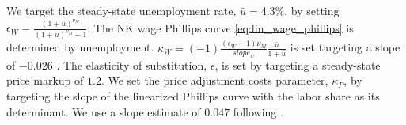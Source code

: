 \documentclass[12pt,3p,authoryear,review]{elsarticle}
\begin{document}
We target the steady-state unemployment rate, $\bar{u}=4.3\%$, by setting $\epsilon_W  = \frac{(1+\bar{u})^{\nu_M}}{(1+\bar{u})^{\nu_M} - 1}$. The NK wage Phillips curve \eqref{eq:lin_wage_phillips} is determined by unemployment. $\kappa_W = (-1)\frac{(\epsilon_W-1)\nu_M}{slope_w} \frac{\bar{u}}{1+\bar{u}}$ is set targeting a slope of $-0.026$ \citep{galiHasUSWage2019}. The elasticity of substitution, $\epsilon$, is set by targeting a steady-state price markup of $1.2$. We set the price adjustment costs parameter, $\kappa_P$, by targeting the slope of the linearized Phillips curve with the labor share as its determinant. We use a slope estimate of $0.047$ following \cite{galiInflationDynamicsStructural1999}.%
\end{document}
